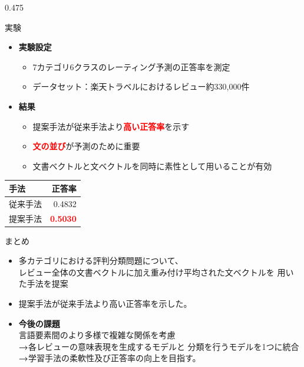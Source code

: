 \documentclass[unicode,10pt]{beamer}
\newcommand{\arrow}{\textcolor{ttiblue}{\textbf{→}}\hspace{1ex}}
\newcommand{\itemtitle}[1]{\textbf{#1}\\}
\newcommand{\fire}[1]{\textcolor{red}{\textbf{#1}}}
\newcommand{\columnsize}{0.475\textwidth}
\begin{document}
\begin{frame}
\begin{columns}[onlytextwidth,t]
\begin{column}{\columnsize}
  \begin{block}{実験}
    \begin{itemize}
      \item \itemtitle{実験設定}
        \begin{itemize}
          \item 7カテゴリ6クラスのレーティング予測の正答率を測定
          \item データセット：楽天トラベルにおけるレビュー約330,000件
        \end{itemize}
      \item \itemtitle{結果}
        \begin{itemize}
          \item 提案手法が従来手法より\fire{高い正答率}を示す
          \item \fire{文の並び}が予測のために重要
          \item 文書ベクトルと文ベクトルを同時に素性として用いることが有効
        \end{itemize}
    \end{itemize}
    \begin{table}
      \centering
      \begin{tabular}{l | r}
        手法 & 正答率 \\
        \hline
        従来手法 & 0.4832 \\
        提案手法 & \fire{0.5030} \\
      \end{tabular}
    \end{table}
  \end{block}

  \begin{block}{まとめ}
    \begin{itemize}
      \item 多カテゴリにおける評判分類問題について、\\
            レビュー全体の文書ベクトルに加え重み付け平均された文ベクトルを
            用いた手法を提案
      \item 提案手法が従来手法\cite{fujitani15}より高い正答率を示した。
      \item \itemtitle{今後の課題}
            言語要素間のより多様で複雑な関係を考慮 \\
            \arrow 各レビューの意味表現を生成するモデルと
                   分類を行うモデルを1つに統合 \\
            \arrow 学習手法の柔軟性及び正答率の向上を目指す。
    \end{itemize}
  \end{block}


\end{column}
\end{columns}
\end{frame}
\end{document}
